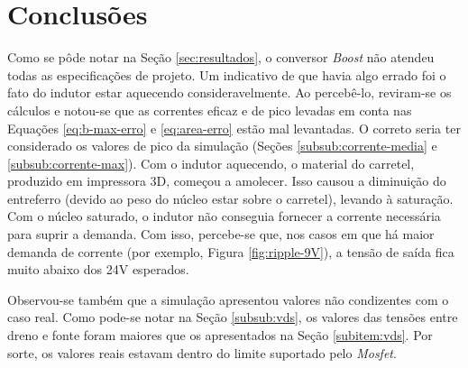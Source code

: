 \documentclass[a4paper]{article}
\begin{document}
{\clearpage

\section{Conclusões}
\label{sec:conclusoes}

Como se pôde notar na Seção \ref{sec:resultados}, o conversor \emph{Boost} não atendeu todas as especificações de projeto. Um indicativo de que havia algo errado foi o fato do indutor estar aquecendo consideravelmente. Ao percebê-lo, reviram-se os cálculos e notou-se que as correntes eficaz e de pico levadas em conta nas Equações \ref{eq:b-max-erro} e \ref{eq:area-erro} estão mal levantadas. O correto seria ter considerado os valores de pico da simulação (Seções \ref{subsub:corrente-media} e \ref{subsub:corrente-max}). Com o indutor aquecendo, o material do carretel, produzido em impressora 3D, começou a amolecer. Isso causou a diminuição do entreferro (devido ao peso do núcleo estar sobre o carretel), levando à saturação. Com o núcleo saturado, o indutor não conseguia fornecer a corrente necessária para suprir a demanda. Com isso, percebe-se que, nos casos em que há maior demanda de corrente (por exemplo, Figura \ref{fig:ripple-9V}), a tensão de saída fica muito abaixo dos 24V esperados.

Observou-se também que a simulação apresentou valores não condizentes com o caso real. Como pode-se notar na Seção \ref{subsub:vds}, os valores das tensões entre dreno e fonte foram maiores que os apresentados na
Seção \ref{subitem:vds}. Por sorte, os valores reais estavam dentro do limite suportado pelo \emph{Mosfet}.

}
\end{document}
